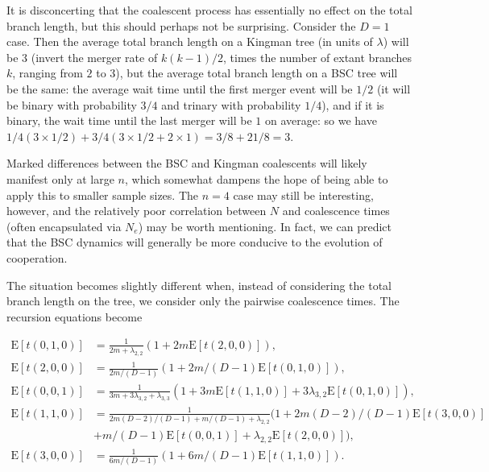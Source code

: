 \documentclass[rmp]{revtex4}
\begin{document}
It is disconcerting that the coalescent process has essentially no effect on the total branch length, but this should perhaps not be surprising.
Consider the $D=1$ case.
Then the average total branch length on a Kingman tree (in units of $\lambda$) will be $3$ (invert the merger rate of $k(k-1)/2$, times the number of extant branches $k$, ranging from $2$ to $3$), but the average total branch length on a BSC tree will be the same: the average wait time until the first merger event will be $1/2$ (it will be binary with probability $3/4$ and trinary with probability $1/4$), and if it is binary, the wait time until the last merger will be $1$ on average: so we have $1/4(3 \times 1/2) + 3/4(3 \times 1/2 + 2 \times 1) = 3/8+21/8 = 3$.

Marked differences between the BSC and Kingman coalescents will likely manifest only at large $n$, which somewhat dampens the hope of being able to apply this to smaller sample sizes.
The $n=4$ case may still be interesting, however, and the relatively poor correlation between $N$ and coalescence times (often encapsulated via $N_e$) may be worth mentioning.
In fact, we can predict that the BSC dynamics will generally be more conducive to the evolution of cooperation.

The situation becomes slightly different when, instead of considering the total branch length on the tree, we consider only the pairwise coalescence times.
The recursion equations become

\begin{align}
\mathrm{E} \left[ t(0,1,0) \right] &= \frac{1}{2m + \lambda_{2,2}} (1 + 2m \mathrm{E} \left[ t(2,0,0) \right]), \\
\mathrm{E} \left[ t(2,0,0) \right] &= \frac{1}{2m/(D-1)} (1 + 2m/(D-1) \mathrm{E} \left[ t(0,1,0) \right] ), \\
\mathrm{E} \left[ t(0,0,1) \right] &= \frac{1}{3m + 3\lambda_{3,2} + \lambda_{3,3}} (1 +3m \mathrm{E} \left[ t(1,1,0) \right] + 3\lambda_{3,2} \mathrm{E} \left[ t(0,1,0) \right]),\\
\mathrm{E} \left[ t(1,1,0) \right] &= \frac{1}{2m(D-2)/(D-1) + m/(D-1) + \lambda_{2,2}} (1 + 2m(D-2)/(D-1) \mathrm{E} \left[ t(3,0,0) \right] \\
&+ m/(D-1) \mathrm{E} \left[ t(0,0,1) \right] + \lambda_{2,2} \mathrm{E} \left[ t(2,0,0) \right]), \\
\mathrm{E} \left[ t(3,0,0) \right] &= \frac{1}{6m/(D-1)} (1 + 6m/(D-1) \mathrm{E} \left[ t(1,1,0) \right]).
\end{align}
\end{document}
